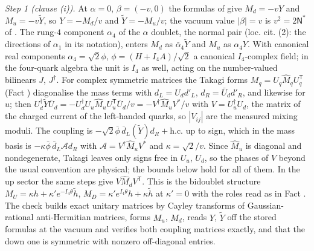 \emph{Step 1 (clause (i)).} At $\alpha = 0$, $\beta = (-v, 0)$ the formulas of  give $M_{d} = -vY$ and $M_{u} = -v\tilde{Y}$, so $Y = -M_{d}/v$ and $\tilde{Y} = -M_{u}/v$; the vacuum value $|\beta| = v$ is $v^{2} = 2\mathsf{N}^{*}$ of . The rung-$4$ component $\alpha_{4}$ of the $\alpha$ doublet, the normal pair (loc. cit. (2): the directions of $\alpha_{1}$ in its notation), enters $M_{d}$ as $\bar{\alpha}_{4}\tilde{Y}$ and $M_{u}$ as $\alpha_{4}Y$. With canonical real components $\alpha_{4} = \sqrt2\phi$, $\phi = (H + I_{4}A)/\sqrt2$ a canonical $I_{4}$-complex field; in the four-quark algebra the unit is $I_{4}$ as well, acting on the number-valued bilinears $J$, $J^{\dagger}$. For complex symmetric matrices the Takagi forms $M_{q} = U_{q}\hat{M}_{q}U_{q}^{\mathsf T}$ (Fact ) diagonalise the mass terms with $d_{L} = U_{d}d'_{L}$, $d_{R} = \bar{U}_{d}d'_{R}$, and likewise for $u$; then $U_{d}^{\dagger}\tilde{Y}\bar{U}_{d} = -U_{d}^{\dagger}U_{u}\hat{M}_{u}U_{u}^{\mathsf T}\bar{U}_{d}/v = -V^{\dagger}\hat{M}_{u}V^{*}/v$ with $V = U_{u}^{\dagger}U_{d}$, the matrix of the charged current of the left-handed quarks, so $|V_{ij}|$ are the measured mixing moduli. The coupling is $-\sqrt2\bar\phi\,\bar{d}_{L}(\tilde{Y})d_{R} + \mathrm{h.c.}$ up to sign, which in the mass basis is $-\kappa\bar\phi\,\bar{d}_{L}\mathcal{A}d_{R}$ with $\mathcal{A} = V^{\dagger}\hat{M}_{u}V^{*}$ and $\kappa = \sqrt2/v$. Since $\hat{M}_{u}$ is diagonal and nondegenerate, Takagi leaves only signs free in $U_{u}$, $U_{d}$, so the phases of $V$ beyond the usual convention are physical; the bounds below hold for all of them. In the up sector the same steps give $V\hat{M}_{d}V^{\mathsf T}$. This is the bidoublet structure $M_{U} = \kappa h + \kappa'e^{-I_{4}\theta}\tilde{h}$, $M_{D} = \kappa'e^{I_{4}\theta}h + \kappa\tilde{h}$ at $\kappa' = 0$ with the roles read as in Fact . The check builds exact unitary matrices by Cayley transforms of Gaussian-rational anti-Hermitian matrices, forms $M_{u}$, $M_{d}$, reads $Y$, $\tilde{Y}$ off the stored formulas at the vacuum and verifies both coupling matrices exactly, and that the down one is symmetric with nonzero off-diagonal entries.

